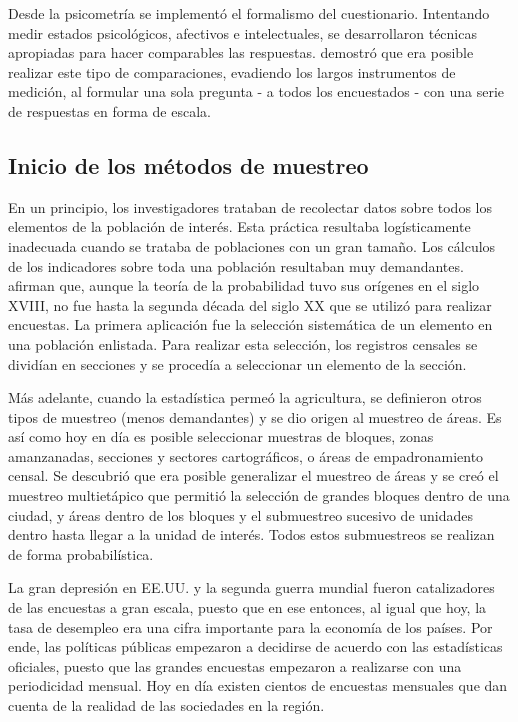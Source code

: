 \documentclass[
  12pt,
]{book}
\begin{document}
Desde la psicometría se implementó el formalismo del cuestionario. Intentando medir estados psicológicos, afectivos e intelectuales, se desarrollaron técnicas apropiadas para hacer comparables las respuestas. \citet{Likert_1932} demostró que era posible realizar este tipo de comparaciones, evadiendo los largos instrumentos de medición, al formular una sola pregunta - a todos los encuestados - con una serie de respuestas en forma de escala.

\hypertarget{inicio-de-los-muxe9todos-de-muestreo}{%
\subsection{Inicio de los métodos de muestreo}\label{inicio-de-los-muxe9todos-de-muestreo}}

En un principio, los investigadores trataban de recolectar datos sobre todos los elementos de la población de interés. Esta práctica resultaba logísticamente inadecuada cuando se trataba de poblaciones con un gran tamaño. Los cálculos de los indicadores sobre toda una población resultaban muy demandantes. \citet{Groves_Fowler_Couper_Lepkowski_Singer_Tourangeau_2009} afirman que, aunque la teoría de la probabilidad tuvo sus orígenes en el siglo XVIII, no fue hasta la segunda década del siglo XX que se utilizó para realizar encuestas. La primera aplicación fue la selección sistemática de un elemento en una población enlistada. Para realizar esta selección, los registros censales se dividían en secciones y se procedía a seleccionar un elemento de la sección.

Más adelante, cuando la estadística permeó la agricultura, se definieron otros tipos de muestreo (menos demandantes) y se dio origen al muestreo de áreas. Es así como hoy en día es posible seleccionar muestras de bloques, zonas amanzanadas, secciones y sectores cartográficos, o áreas de empadronamiento censal. Se descubrió que era posible generalizar el muestreo de áreas y se creó el muestreo multietápico que permitió la selección de grandes bloques dentro de una ciudad, y áreas dentro de los bloques y el submuestreo sucesivo de unidades dentro hasta llegar a la unidad de interés. Todos estos submuestreos se realizan de forma probabilística.

La gran depresión en EE.UU. y la segunda guerra mundial fueron catalizadores de las encuestas a gran escala, puesto que en ese entonces, al igual que hoy, la tasa de desempleo era una cifra importante para la economía de los países. Por ende, las políticas públicas empezaron a decidirse de acuerdo con las estadísticas oficiales, puesto que las grandes encuestas empezaron a realizarse con una periodicidad mensual. Hoy en día existen cientos de encuestas mensuales que dan cuenta de la realidad de las sociedades en la región.
\end{document}
